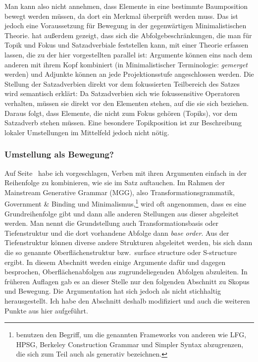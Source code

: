 \begin{exe}
\begin{xlist}
Man kann also nicht annehmen, dass Elemente in eine bestimmte Baumposition bewegt werden müssen,
da dort ein Merkmal überprüft werden muss. Das ist jedoch eine Voraussetzung für Bewegung in
der gegenwärtigen Minimalistischen Theorie. \textcites[Abschnitt~4]{Fanselow2003b}[]{Fanselow2006a} 
hat außerdem gezeigt, dass sich die Abfolgebeschränkungen,
die man für Topik und Fokus und Satzadverbiale
feststellen kann, mit einer Theorie erfassen lassen,
die zu der hier vorgestellten parallel ist: Argumente können eins nach dem anderen mit ihrem Kopf
kombiniert (in Minimalistischer Terminologie: \emph{gemerget} werden) und Adjunkte können an jede
Projektionsstufe angeschlossen werden. Die Stellung der Satzadverbien direkt vor dem fokussierten
Teilbereich des Satzes wird semantisch erklärt: Da Satzadverbien sich wie fokussensitive Operatoren
verhalten, müssen sie direkt vor den Elementen stehen, auf die sie sich beziehen. Daraus folgt,
dass Elemente, die nicht zum Fokus gehören (Topiks), vor dem Satzadverb stehen müssen. Eine besondere
Topikposition ist zur Beschreibung lokaler Umstellungen im Mittelfeld jedoch nicht nötig.
%

\subsubsection{Umstellung als Bewegung?}

Auf Seite~\pageref{schema-Kopf-Komplementschema-prel2} habe ich vorgeschlagen, Verben mit ihren Argumenten einfach in der Reihenfolge zu
kombinieren, wie sie im Satz auftauchen. Im Rahmen der Mainstream Generative Grammar (MGG), also
Transformationsgrammatik, Government \& Binding und Minimalismus,\footnote{
  \citet[]{CJ2005a} benutzen den Begriff, um die genannten Frameworks von anderen wie LFG,
  HPSG, Berkeley Construction Grammar und Simpler Syntax abzugrenzen, die sich zum Teil auch als
  generativ bezeichnen.
} wird oft angenommen, dass es eine
Grundreihenfolge gibt und dann alle anderen Stellungen aus dieser abgeleitet werden. Man nennt die
Grundstellung auch Transformationsbasis oder Tiefenstruktur und die dort vorhandene Abfolge
dann \emph{base order}. Aus der Tiefenstruktur können diverse andere Strukturen abgeleitet werden,
bis sich dann die so genannte Oberflächenstruktur bzw.\ surface structure oder S-structure ergibt. In diesem
Abschnitt werden einige Argumente dafür und dagegen besprochen, Oberflächenabfolgen aus
zugrundeliegenden Abfolgen abzuleiten. In früheren Auflagen gab es an
dieser Stelle nur den folgenden Abschnitt zu Skopus und Bewegung. Die Argumentation hat sich jedoch
als nicht stichhaltig herausgestellt. Ich habe den Abschnitt deshalb modifiziert und auch die weiteren Punkte aus
 hier aufgeführt.


\end{xlist}
\end{exe}

